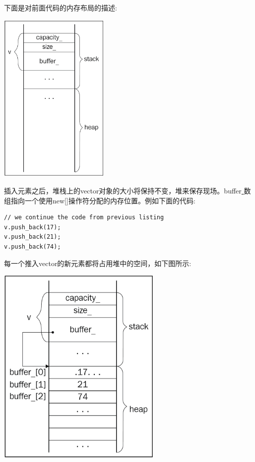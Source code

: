下面是对前面代码的内存布局的描述: \par

\begin{center}
	\includegraphics[width=0.4\textwidth]{content/Section-2/Chapter-6/9}
\end{center}

插入元素之后，堆栈上的vector对象的大小将保持不变，堆来保存现场。buffer\underline{ }数组指向一个使用new[]操作符分配的内存位置。例如下面的代码: \par

\begin{lstlisting}[caption={}]
// we continue the code from previous listing
v.push_back(17);
v.push_back(21);
v.push_back(74);
\end{lstlisting}

每一个推入vector的新元素都将占用堆中的空间，如下图所示: \par

\begin{center}
	\includegraphics[width=0.6\textwidth]{content/Section-2/Chapter-6/10}
\end{center}

